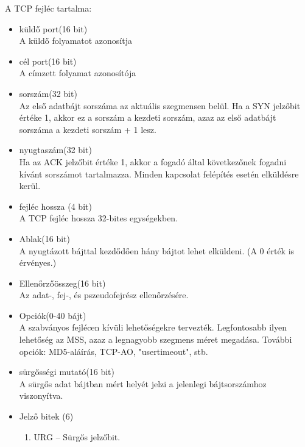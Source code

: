 \documentclass[margin=0px]{article}
\begin{document}
\begin{description}
\begin{itemize}
                  A TCP fejléc tartalma:
                  \begin{itemize}
                      \item küldő port(16 bit)\\
                            A küldő folyamatot azonosítja
                      \item cél port(16 bit)\\
                            A címzett folyamat azonosítója
                      \item sorszám(32 bit)\\
                            Az első adatbájt sorszáma az aktuális szegmensen belül. Ha a SYN jelzőbit értéke 1, akkor ez a sorszám a kezdeti sorszám, azaz az első adatbájt sorszáma a kezdeti sorszám + 1 lesz.
                      \item nyugtaszám(32 bit)\\
                            Ha az ACK jelzőbit értéke 1, akkor a fogadó által következőnek fogadni 	kívánt sorszámot tartalmazza. Minden kapcsolat felépítés esetén elküldésre kerül.
                      \item fejléc hossza (4 bit)\\
                            A TCP fejléc hossza 32-bites egységekben.
                      \item Ablak(16 bit)\\
                            A nyugtázott bájttal kezdődően hány bájtot lehet elküldeni. (A 0 érték is érvényes.)
                      \item Ellenőrzőösszeg(16 bit)\\
                            Az adat-, fej-, és pszeudofejrész ellenőrzésére.
                      \item Opciók(0-40 bájt)\\
                            A szabványos fejlécen kívüli lehetőségekre tervezték. Legfontosabb ilyen lehetőség az MSS, azaz a legnagyobb szegmens méret megadása. További opciók: MD5-aláírás, TCP-AO, "usertimeout", stb.
                      \item sürgősségi mutató(16 bit) \\
                            A sürgős adat bájtban mért helyét jelzi a jelenlegi bájtsorszámhoz viszonyítva.
                      \item Jelző bitek (6)
                            \begin{enumerate}
                                \item URG – Sürgős jelzőbit.

\end{enumerate}
\end{itemize}
\end{itemize}
\end{description}
\end{document}
